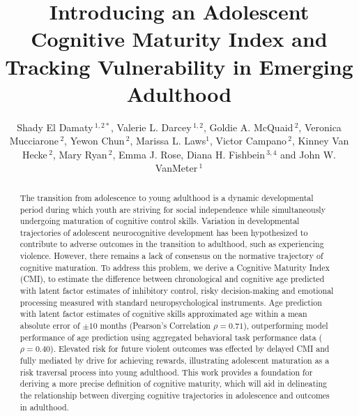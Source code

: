 \documentclass[utf8]{frontiersSCNS} %
\def\firstAuthorLast{El Damaty {et~al.}} %
\def\Authors{Shady El Damaty\,$^{1,2*}$, Valerie L. Darcey\,$^{1,2}$, Goldie A. McQuaid\,$^{2}$, Veronica Mucciarone\,$^{2}$, Yewon Chun\,$^{2}$, Marissa L. Laws$^{1}$, Victor Campano\,$^{2}$, Kinney Van Hecke\,$^{2}$, Mary Ryan\,$^{2}$, Emma J. Rose, Diana H. Fishbein\,$^{3,4}$ and John W. VanMeter\,$^{1}$}
\begin{document}
\onecolumn
{}
\title{Introducing an Adolescent Cognitive Maturity Index and Tracking Vulnerability in Emerging Adulthood} 
\author[\firstAuthorLast ]{\Authors} %
\address{} %
\correspondance{} %
\extraAuth{}
\maketitle \begin{abstract}
The transition from adolescence to young adulthood is a dynamic developmental period during which youth are striving for social independence while simultaneously undergoing maturation of cognitive control skills. Variation in developmental trajectories of adolescent neurocognitive development has been hypothesized to contribute to adverse outcomes in the transition to adulthood, such as experiencing violence. However, there remains a lack of consensus on the normative trajectory of cognitive maturation. To address this problem, we derive a Cognitive Maturity Index (CMI), to estimate the difference between chronological and cognitive age predicted with latent factor estimates of inhibitory control, risky decision-making and emotional processing measured with standard neuropsychological instruments. Age prediction with latent factor estimates of cognitive skills approximated age within a mean absolute error of $\pm 10$ months (Pearson's Correlation $\rho=0.71$), outperforming model performance of age prediction using aggregated behavioral task performance data ($\rho=0.40$). Elevated risk for future violent outcomes was effected by delayed CMI and fully mediated by drive for achieving rewards, illustrating adolescent maturation as a risk traversal process into young adulthood. This work provides a foundation for deriving a more precise definition of cognitive maturity, which will aid in delineating the relationship between diverging cognitive trajectories in adolescence and outcomes in adulthood.


\end{abstract}
\end{document}
